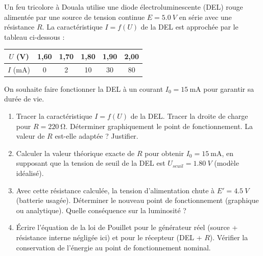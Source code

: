 \documentclass[11pt]{article}
\begin{document}
\begin{exercice}
Un feu tricolore à Douala utilise une diode électroluminescente (DEL) rouge alimentée par une source de tension continue $E = \SI{5,0}{V}$ en série avec une résistance $R$. La caractéristique $I = f(U)$ de la DEL est approchée par le tableau ci-dessous :
\begin{center}
\begin{tabular}{|c|c|c|c|c|c|}
\hline
$U$ (\si{\volt}) & 1,60 & 1,70 & 1,80 & 1,90 & 2,00 \\
\hline $I$ (\si{\milli\ampere}) & 0 & 2 & 10 & 30 & 80 \\
\hline
\end{tabular}
\end{center}
On souhaite faire fonctionner la DEL à un courant $I_0 = \SI{15}{\milli\ampere}$ pour garantir sa durée de vie.
\begin{enumerate}
\item Tracer la caractéristique $I = f(U)$ de la DEL. Tracer la droite de charge pour $R = \SI{220}{\ohm}$. Déterminer graphiquement le point de fonctionnement. La valeur de $R$ est-elle adaptée ? Justifier.
\item Calculer la valeur théorique exacte de $R$ pour obtenir $I_0 = \SI{15}{\milli\ampere}$, en supposant que la tension de seuil de la DEL est $U_{seuil} = \SI{1,80}{V}$ (modèle idéalisé).
\item Avec cette résistance calculée, la tension d'alimentation chute à $E' = \SI{4,5}{V}$ (batterie usagée). Déterminer le nouveau point de fonctionnement (graphique ou analytique). Quelle conséquence sur la luminosité ?
\item Écrire l'équation de la loi de Pouillet pour le générateur réel (source + résistance interne négligée ici) et pour le récepteur (DEL + $R$). Vérifier la conservation de l'énergie au point de fonctionnement nominal.
\end{enumerate}
\end{exercice}
\end{document}
